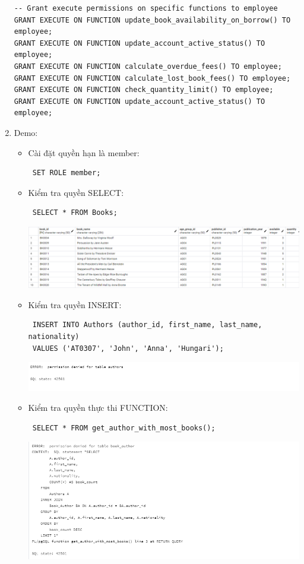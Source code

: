 \documentclass[12pt]{article}
\begin{document}
\begin{enumerate}
\begin{lstlisting}
-- Grant execute permissions on specific functions to employee
GRANT EXECUTE ON FUNCTION update_book_availability_on_borrow() TO employee;
GRANT EXECUTE ON FUNCTION update_account_active_status() TO employee;
GRANT EXECUTE ON FUNCTION calculate_overdue_fees() TO employee;
GRANT EXECUTE ON FUNCTION calculate_lost_book_fees() TO employee;
GRANT EXECUTE ON FUNCTION check_quantity_limit() TO employee;
GRANT EXECUTE ON FUNCTION update_account_active_status() TO employee;
\end{lstlisting}
\item  Demo:
    \begin{itemize}
    \item Cài đặt quyền hạn là member:
        \begin{lstlisting}
 SET ROLE member; 
    \end{lstlisting}
    \item Kiểm tra quyền SELECT:
         \begin{lstlisting}
 SELECT * FROM Books; 
    \end{lstlisting}
    \includegraphics[width=1\linewidth]{dtb1.png}
    \item Kiểm tra quyền INSERT:
          \begin{lstlisting}
 INSERT INTO Authors (author_id, first_name, last_name, nationality)
 VALUES ('AT0307', 'John', 'Anna', 'Hungari'); 
    \end{lstlisting}
    \includegraphics[width=1.1\linewidth]{dtb5.png}
    \item Kiểm tra quyền thực thi FUNCTION:
          \begin{lstlisting}
 SELECT * FROM get_author_with_most_books(); 
    \end{lstlisting}
    \includegraphics[width=1\linewidth]{dtb4.png}
    \end{itemize} 
\end{enumerate}    
\end{document}
